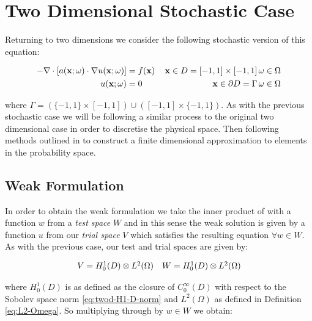 \chapter{Two Dimensional Stochastic Case}\label{chap:twod-stochastic}

Returning to two dimensions we consider the following stochastic version of
this equation:

\begin{equation}\label{eq:twod-stochastic}
  \begin{aligned}
      -\nabla\cdot\left[a(\mathbf{x};\omega)\cdot\nabla u(\mathbf{x};\omega) \right]
      &= f(\mathbf{x})\, &\mathbf{x} \in D = [-1,1] \times [-1,1]\, \omega \in \Omega \\
      u(\mathbf{x};\omega) &= 0\, &\mathbf{x} \in \partial D = \Gamma\, \omega \in \Omega
  \end{aligned}
\end{equation}

where $\Gamma = (\{-1,1\} \times [-1,1]) \cup ([-1,1] \times \{-1, 1\})$.  As
with the previous stochastic case we will be following a similar process to the
original two dimensional case in order to discretise the physical space. Then
following methods outlined in \cite{general-poly-chaos} to construct a finite
dimensional approximation to elements in the probability space.

\section{Weak Formulation}

In order to obtain the weak formulation we take the inner product of
 with a function $w$ from a \textit{test space} $W$
and in this sense the weak solution is given by a function $u$ from our
\textit{trial space} $V$ which satisfies the resulting equation $\forall w \in
W$. As with the previous case, our test and trial spaces are given by:

\begin{equation}
    \begin{array}{c c}
        V = H^1_0(D) \otimes L^2(\Omega) &
        W = H^1_0(D) \otimes L^2(\Omega)
    \end{array}
\end{equation}

where $H^1_0(D)$ is as defined as the closure of $C_0^\infty(D)$ with respect
to the Sobolev space norm \ref{eq:twod-H1-D-norm} and $L^2(\Omega)$ as defined
in Definition \ref{eq:L2-Omega}. So multiplying through by $w \in W$ we obtain:

